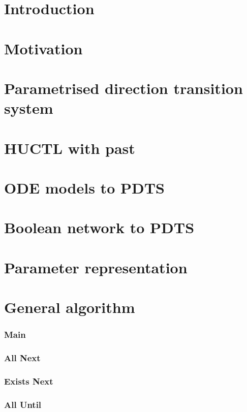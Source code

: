 






\chapter{Introduction}

\chapter{Motivation}

\chapter{Parametrised direction transition system}

\chapter{HUCTL with past}

\chapter{ODE models to PDTS}

\chapter{Boolean network to PDTS}

\chapter{Parameter representation}

\chapter{General algorithm}
	\subsection{Main}
	\subsection{All Next}
	\subsection{Exists Next}
	\subsection{All Until}
